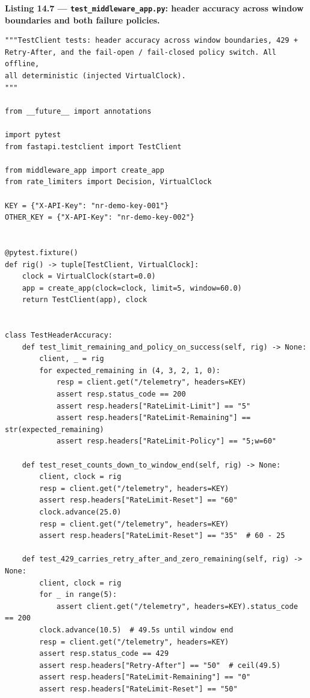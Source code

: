 \noindent\textbf{Listing 14.7 --- \texttt{test\_middleware\_app.py}: header
accuracy across window boundaries and both failure policies.}
\label{lst:ch14-middleware-tests}
\begin{verbatim}
"""TestClient tests: header accuracy across window boundaries, 429 +
Retry-After, and the fail-open / fail-closed policy switch. All offline,
all deterministic (injected VirtualClock).
"""

from __future__ import annotations

import pytest
from fastapi.testclient import TestClient

from middleware_app import create_app
from rate_limiters import Decision, VirtualClock

KEY = {"X-API-Key": "nr-demo-key-001"}
OTHER_KEY = {"X-API-Key": "nr-demo-key-002"}


@pytest.fixture()
def rig() -> tuple[TestClient, VirtualClock]:
    clock = VirtualClock(start=0.0)
    app = create_app(clock=clock, limit=5, window=60.0)
    return TestClient(app), clock


class TestHeaderAccuracy:
    def test_limit_remaining_and_policy_on_success(self, rig) -> None:
        client, _ = rig
        for expected_remaining in (4, 3, 2, 1, 0):
            resp = client.get("/telemetry", headers=KEY)
            assert resp.status_code == 200
            assert resp.headers["RateLimit-Limit"] == "5"
            assert resp.headers["RateLimit-Remaining"] == str(expected_remaining)
            assert resp.headers["RateLimit-Policy"] == "5;w=60"

    def test_reset_counts_down_to_window_end(self, rig) -> None:
        client, clock = rig
        resp = client.get("/telemetry", headers=KEY)
        assert resp.headers["RateLimit-Reset"] == "60"
        clock.advance(25.0)
        resp = client.get("/telemetry", headers=KEY)
        assert resp.headers["RateLimit-Reset"] == "35"  # 60 - 25

    def test_429_carries_retry_after_and_zero_remaining(self, rig) -> None:
        client, clock = rig
        for _ in range(5):
            assert client.get("/telemetry", headers=KEY).status_code == 200
        clock.advance(10.5)  # 49.5s until window end
        resp = client.get("/telemetry", headers=KEY)
        assert resp.status_code == 429
        assert resp.headers["Retry-After"] == "50"  # ceil(49.5)
        assert resp.headers["RateLimit-Remaining"] == "0"
        assert resp.headers["RateLimit-Reset"] == "50"


\end{verbatim}
